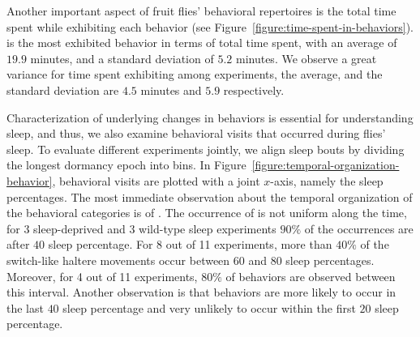 Another important aspect of fruit flies' behavioral repertoires is the total time spent while exhibiting each behavior (see Figure~\ref{figure:time-spent-in-behaviors}).
\CGrooming is the most exhibited behavior in terms of total time spent, with an average of $19.9$ minutes, and a standard deviation of $5.2$ minutes.
We observe a great variance for time spent exhibiting \HaltereSwitch among experiments, the average, and the standard deviation are $4.5$ minutes and $5.9$ respectively.

Characterization of underlying changes in behaviors is essential for understanding sleep, and thus, we also examine behavioral visits that occurred during flies' sleep.
To evaluate different experiments jointly, we align sleep bouts by dividing the longest dormancy epoch into bins.
In Figure~\ref{figure:temporal-organization-behavior}, behavioral visits are plotted with a joint $x$-axis, namely the sleep percentages.
The most immediate observation about the temporal organization of the behavioral categories is of \HaltereSwitch.
The occurrence of \HaltereSwitch is not uniform along the time, for 3 sleep-deprived and 3 wild-type sleep experiments $90\%$ of the \HaltereSwitch occurrences are after $40$ sleep percentage.
For 8 out of 11 experiments, more than $40\%$ of the switch-like haltere movements occur between $60$ and $80$ sleep percentages.
Moreover, for 4 out of 11 experiments, $80\%$ of \HaltereSwitch behaviors are observed between this interval.
Another observation is that \Grooming behaviors are more likely to occur in the last $40$ sleep percentage and very unlikely to occur within the first $20$ sleep percentage.
